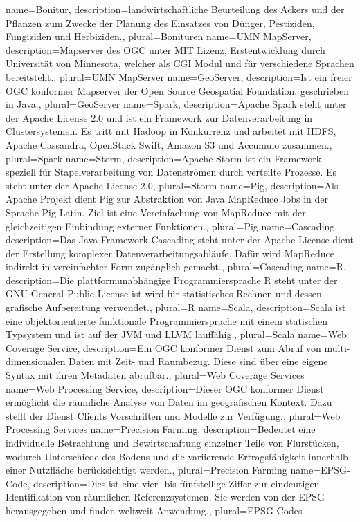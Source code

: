 {
  name=Bonitur,
  description={landwirtschaftliche Beurteilung des Ackers und der Pflanzen zum Zwecke der Planung des Einsatzes von Dünger, Pestiziden, Fungiziden und Herbiziden.},
  plural=Bonituren
}
{
  name=UMN MapServer,
  description={Mapserver des OGC unter MIT Lizenz, Erstentwicklung durch Universität von Minnesota, welcher als CGI Modul und für verschiedene Sprachen  bereitsteht.},
  plural=UMN MapServer
}
{
  name=GeoServer,
  description={Ist ein freier OGC konformer Mapserver der Open Source Geospatial Foundation, geschrieben in Java.},
  plural=GeoServer
}
{
  name=Spark,
  description={Apache Spark steht unter der Apache License 2.0 und ist ein Framework zur Datenverarbeitung in Clustersystemen. Es tritt mit Hadoop in Konkurrenz und arbeitet mit HDFS, Apache Cassandra, OpenStack Swift, Amazon S3 und Accumulo zusammen.},
  plural=Spark
}
{
  name=Storm,
  description={Apache Storm ist ein Framework speziell für Stapelverarbeitung von Datenströmen durch verteilte Prozesse. Es steht unter der Apache License 2.0},
  plural=Storm
}
{
  name=Pig,
  description={Als Apache Projekt dient Pig zur Abstraktion von Java MapReduce Jobs in der Sprache Pig Latin. Ziel ist eine Vereinfachung von MapReduce mit der gleichzeitigen Einbindung externer Funktionen.},
  plural=Pig
}
{
  name=Cascading,
  description={Das Java Framework Cascading steht unter der Apache License dient der Erstellung komplexer Datenverarbeitungsabläufe. Dafür wird MapReduce indirekt in vereinfachter Form zugänglich gemacht.},
  plural=Cascading
}
{
  name=R,
  description={Die plattformunabhängige Programmiersprache R steht unter der GNU General Public License ist wird für statistisches Rechnen und dessen grafische Aufbereitung verwendet.},
  plural=R
}
{
  name=Scala,
  description={Scala ist eine objektorientierte funktionale Programmiersprache mit einem statischen Typsystem und ist auf der JVM und LLVM lauffähig.},
  plural=Scala
}
{
  name=Web Coverage Service,
  description={Ein OGC konformer Dienst zum Abruf von multi-dimensionalen Daten mit Zeit- und Raumbezug. Diese sind über eine eigene Syntax mit ihren Metadaten abrufbar.},
  plural=Web Coverage Services
}
{
  name=Web Processing Service,
  description={Dieser OGC konformer Dienst ermöglicht die räumliche Analyse von Daten im geografischen Kontext. Dazu stellt der Dienst Clients Vorschriften und Modelle zur Verfügung.},
  plural=Web Processing Services
}
{
  name=Precision Farming,
  description={Bedeutet eine individuelle Betrachtung und Bewirtschaftung einzelner Teile von Flurstücken, wodurch Unterschiede des Bodens und die variierende Ertragsfähigkeit innerhalb einer Nutzfläche berücksichtigt werden.},
  plural=Precision Farming
}
{
  name=EPSG-Code,
  description={Dies ist eine vier- bis fünfstellige Ziffer zur eindeutigen Identifikation von räumlichen Referenzsystemen. Sie werden von der EPSG herausgegeben und finden weltweit Anwendung.},
  plural=EPSG-Codes
}